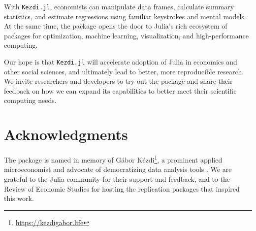 \documentclass{juliacon}
\begin{document}
With \texttt{Kezdi.jl}, economists can manipulate data frames, calculate summary statistics, and estimate regressions using familiar keystrokes and mental models. At the same time, the package opens the door to Julia's rich ecosystem of packages for optimization, machine learning, visualization, and high-performance computing.

Our hope is that \texttt{Kezdi.jl} will accelerate adoption of Julia in economics and other social sciences, and ultimately lead to better, more reproducible research. We invite researchers and developers to try out the package and share their feedback on how we can expand its capabilities to better meet their scientific computing needs.

\section*{Acknowledgments}

The package is named in memory of Gábor Kézdi\footnote{\url{https://kezdigabor.life}}, a prominent applied microeconomist and advocate of democratizing data analysis tools \cite{gabors-data}. We are grateful to the Julia community for their support and feedback, and to the Review of Economic Studies for hosting the replication packages that inspired this work.


\end{document}
